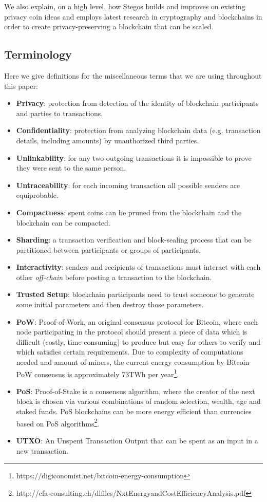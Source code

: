 \documentclass[a4paper, 10pt, conference]{ieeeconf}
\begin{document}
We also explain, on a high level, how Stegos builds and improves on existing privacy coin ideas and employs latest research in cryptography and blockchains in order to create privacy-preserving a blockchain that can be scaled. 

\subsection{Terminology}
Here we give definitions for the miscellaneous terms that we are using throughout this paper:

\begin{itemize}
	\item \textbf{Privacy}: protection from detection of the identity of blockchain participants and parties to transactions.
	\item \textbf{Confidentiality}: protection from analyzing blockchain data (e.g. transaction details, including amounts) by unauthorized third parties.
	\item \textbf{Unlinkability}: for any two outgoing transactions it is impossible to prove they were sent to the same person\cite{c2}.
	\item \textbf{Untraceability}: for each incoming transaction all possible senders are equiprobable\cite{c2}.
	\item \textbf{Compactness}: spent coins can be pruned from the blockchain and the blockchain can be compacted.
	\item \textbf{Sharding}: a transaction verification and block-sealing process that can be partitioned between participants or groups of participants.
	\item \textbf{Interactivity}: senders and recipients of transactions must interact with each other \textit{off-chain} before posting a transaction to the blockchain.
	\item \textbf{Trusted Setup}: blockchain participants need to trust someone to generate some initial parameters and then destroy those parameters.
	\item \textbf{PoW}: Proof-of-Work, an original consensus protocol for Bitcoin, where each node participating in the protocol should present a piece of data which is difficult (costly, time-consuming) to produce but easy for others to verify and which satisfies certain requirements. Due to complexity of computations needed and amount of miners, the current energy consumption by Bitcoin PoW consensus is approximately 73TWh per year\footnote{https://digiconomist.net/bitcoin-energy-consumption}.
	\item \textbf{PoS}: Proof-of-Stake is a consensus algorithm, where the creator of the next block is chosen via various combinations of random selection, wealth, age and staked funds. PoS blockchains can be more energy efficient than currencies based on PoS algorithms\footnote{http://cfa-consulting.ch/dlfiles/NxtEnergyandCostEfficiencyAnalysis.pdf}.
	\item \textbf{UTXO}: An Unspent Transaction Output that can be spent as an input in a new transaction.
\end{itemize}
\end{document}
